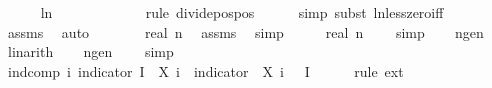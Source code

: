 \begin{isabellebody}
\ \ \isamarkupfalse%
\ {\isachardoublequoteopen}{}\ {\isacharless}{\kern0pt}\ {\isacharminus}{\kern0pt}ln\ {\isasymepsilon}\ {\isacharslash}{\kern0pt}\ {\isacharparenleft}{\kern0pt}{}\ {\isacharasterisk}{\kern0pt}\ {\isasymalpha}\ \ \isanewline
\ \ \ \ \isamarkupfalse%
\ {\isacharparenleft}{\kern0pt}rule\ divide{\isacharunderscore}{\kern0pt}pos{\isacharunderscore}{\kern0pt}pos{\isacharparenright}{\kern0pt}\isanewline
\ \ \ \ \isamarkupfalse%
\ {\isacharparenleft}{\kern0pt}simp{\isacharcomma}{\kern0pt}\ subst\ ln{\isacharunderscore}{\kern0pt}less{\isacharunderscore}{\kern0pt}zero{\isacharunderscore}{\kern0pt}iff{\isacharparenright}{\kern0pt}\isanewline
\ \ \ \ \isamarkupfalse%
\ assms\ \isamarkupfalse%
\ auto\isanewline
\ \ \isamarkupfalse%
\ \isamarkupfalse%
\ {\isachardoublequoteopen}{\isachardot}{\kern0pt}{\isachardot}{\kern0pt}{\isachardot}{\kern0pt}\ {\isasymle}\ real\ n{\isachardoublequoteclose}\ \isamarkupfalse%
\ assms\ \isamarkupfalse%
\ simp\isanewline
\ \ \isamarkupfalse%
\ \isamarkupfalse%
\ {\isachardoublequoteopen}real\ n\ {\isachargreater}{\kern0pt}\ {}{\isachardoublequoteclose}\ \isamarkupfalse%
\ simp\isanewline
\ \ \isamarkupfalse%
\ n{\isacharunderscore}{\kern0pt}ge{\isacharunderscore}{\kern0pt}{}{\isacharcolon}{\kern0pt}{\isachardoublequoteopen}n\ {\isasymge}\ {}{\isachardoublequoteclose}\ \isamarkupfalse%
\ linarith\isanewline
\ \ \isamarkupfalse%
\ n{\isacharunderscore}{\kern0pt}ge{\isacharunderscore}{\kern0pt}{}{\isacharcolon}{\kern0pt}{\isachardoublequoteopen}n\ {\isachargreater}{\kern0pt}\ {}{\isachardoublequoteclose}\ \isamarkupfalse%
\ simp\isanewline
\isanewline
\ \ \isamarkupfalse%
\ ind{\isacharunderscore}{\kern0pt}comp{\isacharcolon}{\kern0pt}\ {\isachardoublequoteopen}{\isasymAnd}i{\isachardot}{\kern0pt}\ indicator\ I\ {\isasymcirc}\ {\isacharparenleft}{\kern0pt}X\ i{\isacharparenright}{\kern0pt}\ {\isacharequal}{\kern0pt}\ indicator\ {\isacharbraceleft}{\kern0pt}{\isasymomega}{\isachardot}{\kern0pt}\ X\ i\ {\isasymomega}\ {\isasymin}\ I{\isacharbraceright}{\kern0pt}{\isachardoublequoteclose}\isanewline
\ \ \ \ \isamarkupfalse%
\ {\isacharparenleft}{\kern0pt}rule\ ext{\isacharparenright}{\kern0pt}\isanewline

\end{isabellebody}
